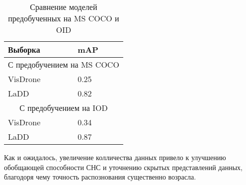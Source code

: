 \begin{table}[H]
    \caption{Сравнение моделей предобученных на MS COCO и OID}\label{leaderboard-2}
    \begin{tabular}{|p{7cm}|p{5cm}|}
        \hline
        {Выборка} & {mAP} \\
        \hline
        \multicolumn{2}{|c|}{С предобучением на MS COCO} \\
        \hline
        VisDrone & 0.25 \\
        \hline
        LaDD & 0.82 \\
        \hline
        \multicolumn{2}{|c|}{С предобучением на IOD} \\
        \hline
        VisDrone & 0.34 \\
        \hline
        LaDD & 0.87 \\
        \hline
    \end{tabular}
\end{table}

Как и ожидалось, увеличение колличества данных привело к улучшению обобщающей способности СНС и уточнению скрытых представлений данных, благодоря чему точность распознования существенно возрасла.
